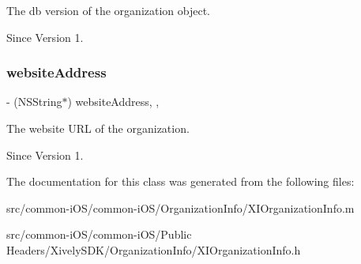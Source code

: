 The db version of the organization object. 

\begin{DoxySince}{Since}
Version 1. 
\end{DoxySince}
\hypertarget{class_x_i_organization_info_a93813b5143f43556adbd0ddd1fec09a7}{}\label{class_x_i_organization_info_a93813b5143f43556adbd0ddd1fec09a7} 
\subsubsection{\texorpdfstring{website\+Address}{websiteAddress}}
{\footnotesize\ttfamily -\/ (N\+S\+String$\ast$) website\+Address\hspace{0.3cm}{\ttfamily [read]}, {\ttfamily [nonatomic]}, {\ttfamily [assign]}}



The website U\+RL of the organization. 

\begin{DoxySince}{Since}
Version 1. 
\end{DoxySince}


The documentation for this class was generated from the following files\+:\begin{DoxyCompactItemize}
\item 
src/common-\/i\+O\+S/common-\/i\+O\+S/\+Organization\+Info/X\+I\+Organization\+Info.\+m\item 
src/common-\/i\+O\+S/common-\/i\+O\+S/\+Public Headers/\+Xively\+S\+D\+K/\+Organization\+Info/X\+I\+Organization\+Info.\+h\end{DoxyCompactItemize}
